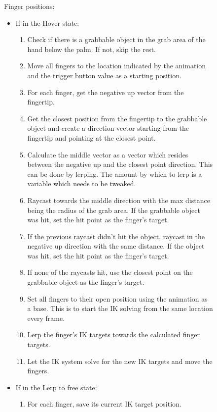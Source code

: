 \begin{figure}[H]
\centering
\small
\begin{flushleft}
Finger positions:
\end{flushleft}
\begin{itemize}[noitemsep]
\item If in the Hover state:
\begin{enumerate}[noitemsep]
\item Check if there is a grabbable object in the grab area of the hand below the palm. If not, skip the rest.
\item Move all fingers to the location indicated by the animation and the trigger button value as a starting position.
\item For each finger, get the negative up vector from the fingertip.
\item Get the closest position from the fingertip to the grabbable object and create a direction vector starting from the fingertip and pointing at the closest point.
\item Calculate the middle vector as a vector which resides between the negative up and the closest point direction. This can be done by lerping. The amount by which to lerp is a variable which needs to be tweaked.
\item Raycast towards the middle direction with the max distance being the radius of the grab area. If the grabbable object was hit, set the hit point as the finger's target.
\item If the previous raycast didn't hit the object, raycast in the negative up direction with the same distance. If the object was hit, set the hit point as the finger's target.
\item If none of the raycasts hit, use the closest point on the grabbable object as the finger's target.
\item Set all fingers to their open position using the animation as a base. This is to start the IK solving from the same location every frame.
\item Lerp the finger's IK targets towards the calculated finger targets.
\item Let the IK system solve for the new IK targets and move the fingers.
\end{enumerate}
\item If in the Lerp to free state:
\begin{enumerate}[noitemsep]
\item For each finger, save its current IK target position.

\end{enumerate}
\end{itemize}
\end{figure}
